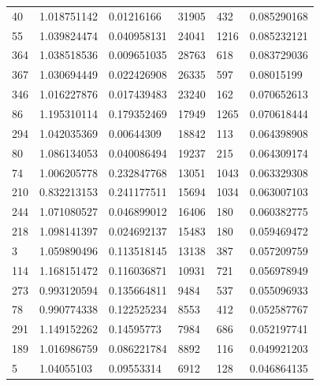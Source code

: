 \documentclass[withoutpreface,bwprint]{cumcmthesis}
\begin{document}
\begin{description}
\begin{longtable}{l|llll|l}
            40   & 1.018751142  & 0.01216166   & 31905    & 432            & 0.085290168    \\
            55   & 1.039824474  & 0.040958131  & 24041    & 1216           & 0.085232121    \\
            364  & 1.038518536  & 0.009651035  & 28763    & 618            & 0.083729036    \\
            367  & 1.030694449  & 0.022426908  & 26335    & 597            & 0.08015199     \\
            346  & 1.016227876  & 0.017439483  & 23240    & 162            & 0.070652613    \\
            86   & 1.195310114  & 0.179352469  & 17949    & 1265           & 0.070618444    \\
            294  & 1.042035369  & 0.00644309   & 18842    & 113            & 0.064398908    \\
            80   & 1.086134053  & 0.040086494  & 19237    & 215            & 0.064309174    \\
            74   & 1.006205778  & 0.232847768  & 13051    & 1043           & 0.063329308    \\
            210  & 0.832213153  & 0.241177511  & 15694    & 1034           & 0.063007103    \\
            244  & 1.071080527  & 0.046899012  & 16406    & 180            & 0.060382775    \\
            218  & 1.098141397  & 0.024692137  & 15483    & 180            & 0.059469472    \\
            3    & 1.059890496  & 0.113518145  & 13138    & 387            & 0.057209759    \\
            114  & 1.168151472  & 0.116036871  & 10931    & 721            & 0.056978949    \\
            273  & 0.993120594  & 0.135664811  & 9484     & 537            & 0.055096933    \\
            78   & 0.990774338  & 0.122525234  & 8553     & 412            & 0.052587767    \\
            291  & 1.149152262  & 0.14595773   & 7984     & 686            & 0.052197741    \\
            189  & 1.016986759  & 0.086221784  & 8892     & 116            & 0.049921203    \\
            5    & 1.04055103   & 0.09553314   & 6912     & 128            & 0.046864135    \\
            \bottomrule
        \end{longtable}
\end{description}
\end{document}
